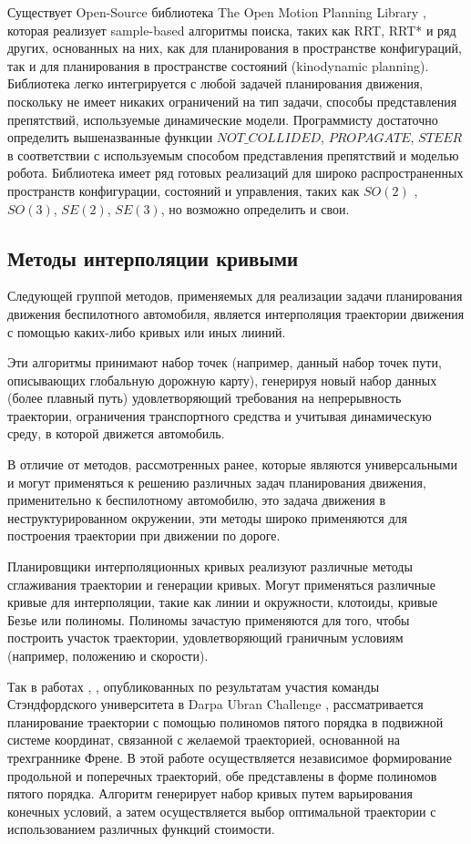 Существует Open-Source библиотека The Open Motion Planning Library \cite{motion_planning_ompl}, которая реализует
sample-based алгоритмы поиска, таких как RRT, RRT* и ряд других, основанных на них, как для планирования в
пространстве конфигураций, так и для планирования в пространстве состояний (kinodynamic planning). Библиотека легко
интегрируется с любой задачей планирования движения, поскольку не имеет никаких ограничений на тип задачи, способы
представления препятствий, используемые динамические модели. Программисту достаточно определить вышеназванные
функции $NOT\_COLLIDED$, $PROPAGATE$, $STEER$ в соответствии с используемым способом представления препятствий и моделью
робота. Библиотека имеет ряд готовых реализаций для широко распространенных пространств конфигурации, состояний и
управления, таких как $SO(2)$ , $SO(3)$, $SE(2)$, $SE(3)$, но возможно определить и свои.


\subsection{Методы интерполяции кривыми}

Следующей группой методов, применяемых для реализации задачи планирования движения беспилотного
автомобиля, является интерполяция траектории движения с помощью каких-либо кривых или иных лииний.

Эти алгоритмы принимают набор точек (например, данный набор точек пути, описывающих глобальную дорожную карту),
генерируя новый набор данных (более плавный путь) удовлетворяющий требования на непрерывность траектории,
ограничения транспортного средства и учитывая динамическую среду, в которой движется автомобиль.

В отличие от методов, рассмотренных ранее, которые являются универсальными и могут применяться к решению
различных задач планирования движения, применительно к беспилотному автомобилю, это задача движения
в неструктурированном окружении,  эти методы широко применяются для построения траектории при движении
по дороге.

Планировщики интерполяционных кривых реализуют различные методы сглаживания траектории и генерации кривых.
Могут применяться различные кривые для интерполяции, такие как линии и окружности, клотоиды, кривые Безье
или полиномы. Полиномы зачастую применяются для того, чтобы построить участок траектории, удовлетворяющий
граничным условиям (например, положению и скорости).

Так в работах \cite{darpa_junior_path_planning_1}, \cite{darpa_junior_frenet},
опубликованных по результатам участия команды Стэндфордского университета в Darpa Ubran Challenge \cite{darpa_overivew},
рассматривается планирование траектории с помощью полиномов пятого порядка в подвижной системе координат,
связанной с желаемой траекторией, основанной на трехграннике Френе.  В этой работе осуществляется независимое
формирование продольной и поперечных траекторий, обе представлены в форме полиномов пятого порядка. Алгоритм генерирует
набор кривых путем варьирования конечных условий, а затем осуществляется выбор оптимальной траектории с использованием
различных функций стоимости.

